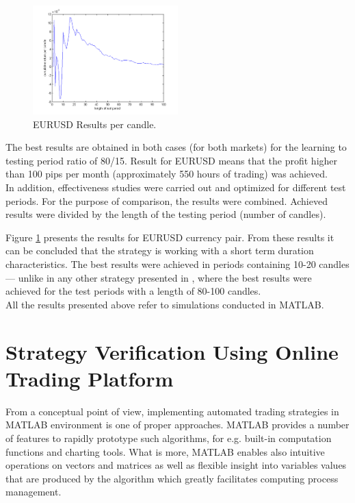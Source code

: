 \documentclass[runningheads,a4paper]{llncs}
\begin{document}
\begin{figure}[h!]
\centering
\includegraphics[width = 0.5\textwidth]{figures/rys10.png}
\caption{EURUSD Results per candle.}
\label{fig:fig10}
\end{figure}
\FloatBarrier

The best results are obtained in both cases (for both markets) for the learning to testing period ratio of 80/15. Result for EURUSD means that the profit higher than 100 pips per month (approximately 550 hours of trading) was achieved.\\

In addition, effectiveness studies were carried out and optimized for different test periods. For the purpose of comparison, the results were combined. Achieved results were divided by the length of the testing period (number of candles). 

Figure \ref{fig:fig10} presents the results for EURUSD currency pair. From these results it can be concluded that the strategy is working with a short term duration characteristics. The best results were achieved in periods containing 10-20 candles --- unlike in any other strategy presented in \cite{Wilinski2014}, where the best results were achieved for the test periods with a length of 80-100 candles.\\
All the results presented above refer to simulations conducted in MATLAB.


\section{Strategy Verification Using Online Trading Platform}
From a conceptual point of view, implementing automated trading strategies in MATLAB environment is one of proper approaches. MATLAB provides a number of features to rapidly prototype such algorithms, for e.g. built-in computation functions and charting tools. What is more, MATLAB enables also intuitive operations on vectors and matrices as well as flexible insight into variables values that are produced by the algorithm which greatly facilitates computing process management.\\
\end{document}
